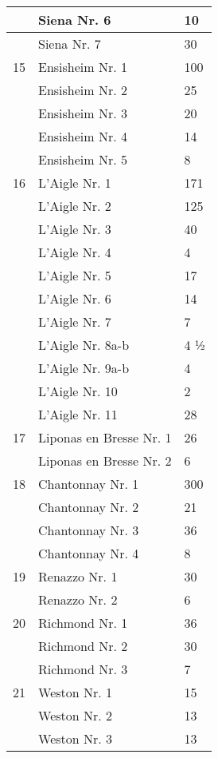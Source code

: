 \documentclass[a4paper, 11pt, oneside, polutonikogreek, german]{article}
\begin{document}
\begin{center}
\begin{longtable}{|l|l|l|}
          & Siena Nr. 6 & 10 \\ \hline
          & Siena Nr. 7 & 30 \\ \hline
        15 & Ensisheim Nr. 1 & 100 \\ \hline
          & Ensisheim Nr. 2 & 25 \\ \hline
          & Ensisheim Nr. 3 & 20 \\ \hline
          & Ensisheim Nr. 4 & 14 \\ \hline
          & Ensisheim Nr. 5 & 8 \\ \hline
        16 & L’Aigle Nr. 1 & 171 \\ \hline
          & L’Aigle Nr. 2 & 125 \\ \hline
          & L’Aigle Nr. 3 & 40 \\ \hline
          & L’Aigle Nr. 4 & 4 \\ \hline
          & L’Aigle Nr. 5 & 17 \\ \hline
          & L’Aigle Nr. 6 & 14 \\ \hline
          & L’Aigle Nr. 7 & 7 \\ \hline
          & L’Aigle Nr. 8a-b & 4 ½ \\ \hline
          & L’Aigle Nr. 9a-b & 4 \\ \hline
          & L’Aigle Nr. 10 & 2 \\ \hline
          & L’Aigle Nr. 11 & 28 \\ \hline
        17 & Liponas en Bresse Nr. 1 & 26 \\ \hline
          & Liponas en Bresse Nr. 2 & 6 \\ \hline
        18 & Chantonnay Nr. 1 & 300 \\ \hline
          & Chantonnay Nr. 2 & 21 \\ \hline
          & Chantonnay Nr. 3 & 36 \\ \hline
          & Chantonnay Nr. 4 & 8 \\ \hline
        19 & Renazzo Nr. 1 & 30 \\ \hline
          & Renazzo Nr. 2 & 6 \\ \hline
        20 & Richmond Nr. 1 & 36 \\ \hline
          & Richmond Nr. 2 & 30 \\ \hline
          & Richmond Nr. 3 & 7 \\ \hline
        21 & Weston Nr. 1 & 15 \\ \hline
          & Weston Nr. 2 & 13 \\ \hline
          & Weston Nr. 3 & 13 \\ \hline

\end{longtable}
\end{center}
\end{document}
